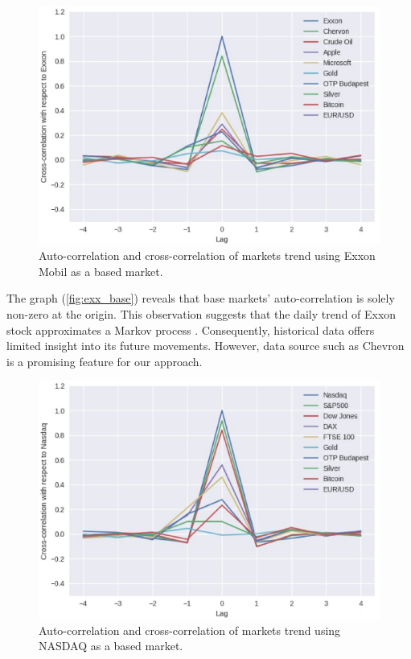 \begin{figure}[H]
	\centering
	\includegraphics[width=1\linewidth]{images/exx_base.eps}
	\caption{Auto-correlation and cross-correlation of markets trend using Exxon
		Mobil as a based market.}
	\label{fig:exx_base}
\end{figure}

The graph (\autoref{fig:exx_base}) reveals that base markets' auto-correlation is solely non-zero at the origin.
This observation suggests that the daily trend of Exxon stock approximates a
Markov process \cite{Shen2012StockMF}. Consequently, historical data offers
limited insight into its future movements. However, data source such as Chevron
is a promising feature for our approach.

\begin{figure}[H]
	\centering
	\includegraphics[width=1\linewidth]{images/nas_base.eps}
	\caption{Auto-correlation and cross-correlation of markets trend using NASDAQ
		as a based market.}
	\label{fig:nas_base}
\end{figure}

